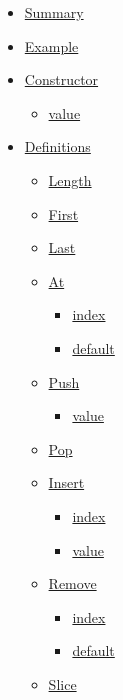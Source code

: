 \begin{itemize}
\tightlist
\item
  \hyperref[summary]{Summary}
\item
  \hyperref[example]{Example}
\item
  \hyperref[constructor]{Constructor}

  \begin{itemize}
  \tightlist
  \item
    \hyperref[constructor-value]{value}
  \end{itemize}
\item
  \hyperref[definitions]{Definitions}

  \begin{itemize}
  \tightlist
  \item
    \hyperref[definitions-len]{Length}
  \item
    \hyperref[definitions-first]{First}
  \item
    \hyperref[definitions-last]{Last}
  \item
    \hyperref[definitions-at]{At}

    \begin{itemize}
    \tightlist
    \item
      \hyperref[definitions-at-index]{index}
    \item
      \hyperref[definitions-at-default]{default}
    \end{itemize}
  \item
    \hyperref[definitions-push]{Push}

    \begin{itemize}
    \tightlist
    \item
      \hyperref[definitions-push-value]{value}
    \end{itemize}
  \item
    \hyperref[definitions-pop]{Pop}
  \item
    \hyperref[definitions-insert]{Insert}

    \begin{itemize}
    \tightlist
    \item
      \hyperref[definitions-insert-index]{index}
    \item
      \hyperref[definitions-insert-value]{value}
    \end{itemize}
  \item
    \hyperref[definitions-remove]{Remove}

    \begin{itemize}
    \tightlist
    \item
      \hyperref[definitions-remove-index]{index}
    \item
      \hyperref[definitions-remove-default]{default}
    \end{itemize}
  \item
    \hyperref[definitions-slice]{Slice}


\end{itemize}
\end{itemize}
